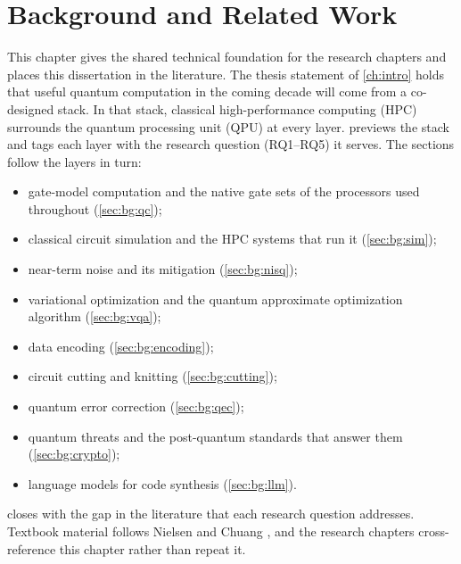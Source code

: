 \chapter{Background and Related Work}\label{ch:background}


This chapter gives the shared technical foundation for the research chapters and places this dissertation in the literature. The thesis statement of \cref{ch:intro} holds that useful quantum computation in the coming decade will come from a co-designed stack. In that stack, classical high-performance computing (HPC) surrounds the quantum processing unit (QPU) at every layer.  previews the stack and tags each layer with the research question (RQ1--RQ5) it serves. The sections follow the layers in turn:
\begin{itemize}
\item gate-model computation and the native gate sets of the processors used throughout (\cref{sec:bg:qc});
\item classical circuit simulation and the HPC systems that run it (\cref{sec:bg:sim});
\item near-term noise and its mitigation (\cref{sec:bg:nisq});
\item variational optimization and the quantum approximate optimization algorithm (\cref{sec:bg:vqa});
\item data encoding (\cref{sec:bg:encoding});
\item circuit cutting and knitting (\cref{sec:bg:cutting});
\item quantum error correction (\cref{sec:bg:qec});
\item quantum threats and the post-quantum standards that answer them (\cref{sec:bg:crypto});
\item language models for code synthesis (\cref{sec:bg:llm}).
\end{itemize}
 closes with the gap in the literature that each research question addresses. Textbook material follows Nielsen and Chuang \cite{nielsen2010qcqi}, and the research chapters cross-reference this chapter rather than repeat it.

